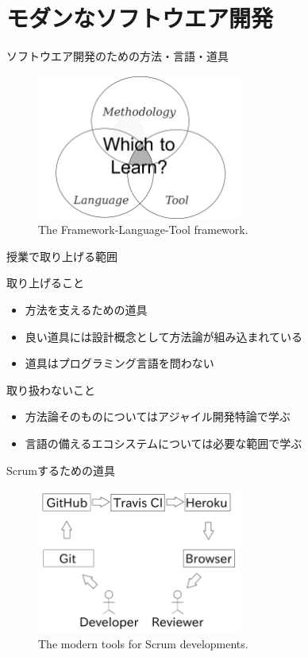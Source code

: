 \documentclass[t, aspectratio=169]{beamer}
\begin{document}
\section{モダンなソフトウエア開発}
\label{sec-1-4}
\begin{frame}[label=sec-1-4-1]{ソフトウエア開発のための方法・言語・道具}
\begin{figure}[htb]
\centering
\includegraphics[width=0.6\textwidth]{./figures/FLT_framework.pdf}
\caption{\label{FLT_framework}The Framework-Language-Tool framework.}
\end{figure}
\end{frame}
\begin{frame}[label=sec-1-4-2]{授業で取り上げる範囲}
\begin{block}{取り上げること}
\begin{itemize}
\item 方法を支えるための道具
\item 良い道具には設計概念として方法論が組み込まれている
\item 道具はプログラミング言語を問わない
\end{itemize}
\end{block}
\begin{block}{取り扱わないこと}
\begin{itemize}
\item 方法論そのものについてはアジャイル開発特論で学ぶ
\item 言語の備えるエコシステムについては必要な範囲で学ぶ
\end{itemize}
\end{block}
\end{frame}
\begin{frame}[label=sec-1-4-3]{Scrumするための道具}
\begin{figure}[htb]
\centering
\includegraphics[width=0.6\textwidth]{./figures/tools.pdf}
\caption{\label{tools}The modern tools for Scrum developments.}
\end{figure}
\end{frame}
\end{document}

